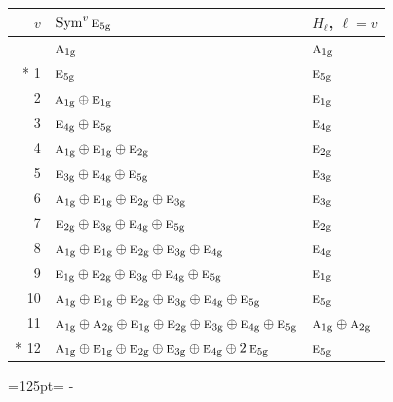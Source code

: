 \documentclass[10pt,a4paper]{article}
\newcommand{\needspace}[1]{\par\penalty-100\begingroup\dimen0=#1\relax\dimen2=\pagegoal
  \advance\dimen2-\pagetotal\ifdim\dimen0>\dimen2\relax\ifdim\dimen2>0pt\vfil\break\fi\fi
  \endgroup}
\numberwithin{equation}{section}
\newcommand{\irr}[1]{\text{\normalfont\scshape #1}}
\newcommand{\ptag}[1]{\mathrm{#1}}
\begin{document}
{\small\begin{longtable}{@{}rll@{}}\toprule
$v$ & $\operatorname{Sym}^{v}\irr{e}_{5\ptag{g}}$ & $H_\ell$, $\ell = v$\\\midrule\endhead
\bottomrule\endfoot\endlastfoot
0 & $\irr{a}_{1\ptag{g}}$ & $\irr{a}_{1\ptag{g}}$\\*
1 & $\irr{e}_{5\ptag{g}}$ & $\irr{e}_{5\ptag{g}}$\\
2 & $\irr{a}_{1\ptag{g}} \oplus \irr{e}_{1\ptag{g}}$ & $\irr{e}_{1\ptag{g}}$\\
3 & $\irr{e}_{4\ptag{g}} \oplus \irr{e}_{5\ptag{g}}$ & $\irr{e}_{4\ptag{g}}$\\
4 & $\irr{a}_{1\ptag{g}} \oplus \irr{e}_{1\ptag{g}} \oplus \irr{e}_{2\ptag{g}}$ & $\irr{e}_{2\ptag{g}}$\\
5 & $\irr{e}_{3\ptag{g}} \oplus \irr{e}_{4\ptag{g}} \oplus \irr{e}_{5\ptag{g}}$ & $\irr{e}_{3\ptag{g}}$\\
6 & $\irr{a}_{1\ptag{g}} \oplus \irr{e}_{1\ptag{g}} \oplus \irr{e}_{2\ptag{g}} \oplus \irr{e}_{3\ptag{g}}$ & $\irr{e}_{3\ptag{g}}$\\
7 & $\irr{e}_{2\ptag{g}} \oplus \irr{e}_{3\ptag{g}} \oplus \irr{e}_{4\ptag{g}} \oplus \irr{e}_{5\ptag{g}}$ & $\irr{e}_{2\ptag{g}}$\\
8 & $\irr{a}_{1\ptag{g}} \oplus \irr{e}_{1\ptag{g}} \oplus \irr{e}_{2\ptag{g}} \oplus \irr{e}_{3\ptag{g}} \oplus \irr{e}_{4\ptag{g}}$ & $\irr{e}_{4\ptag{g}}$\\
9 & $\irr{e}_{1\ptag{g}} \oplus \irr{e}_{2\ptag{g}} \oplus \irr{e}_{3\ptag{g}} \oplus \irr{e}_{4\ptag{g}} \oplus \irr{e}_{5\ptag{g}}$ & $\irr{e}_{1\ptag{g}}$\\
10 & $\irr{a}_{1\ptag{g}} \oplus \irr{e}_{1\ptag{g}} \oplus \irr{e}_{2\ptag{g}} \oplus \irr{e}_{3\ptag{g}} \oplus \irr{e}_{4\ptag{g}} \oplus \irr{e}_{5\ptag{g}}$ & $\irr{e}_{5\ptag{g}}$\\
11 & $\irr{a}_{1\ptag{g}} \oplus \irr{a}_{2\ptag{g}} \oplus \irr{e}_{1\ptag{g}} \oplus \irr{e}_{2\ptag{g}} \oplus \irr{e}_{3\ptag{g}} \oplus \irr{e}_{4\ptag{g}} \oplus \irr{e}_{5\ptag{g}}$ & $\irr{a}_{1\ptag{g}} \oplus \irr{a}_{2\ptag{g}}$\\*
12 & $\irr{a}_{1\ptag{g}} \oplus \irr{e}_{1\ptag{g}} \oplus \irr{e}_{2\ptag{g}} \oplus \irr{e}_{3\ptag{g}} \oplus \irr{e}_{4\ptag{g}} \oplus 2\,\irr{e}_{5\ptag{g}}$ & $\irr{e}_{5\ptag{g}}$\\
\bottomrule\end{longtable}}
\needspace{125pt}
\end{document}
